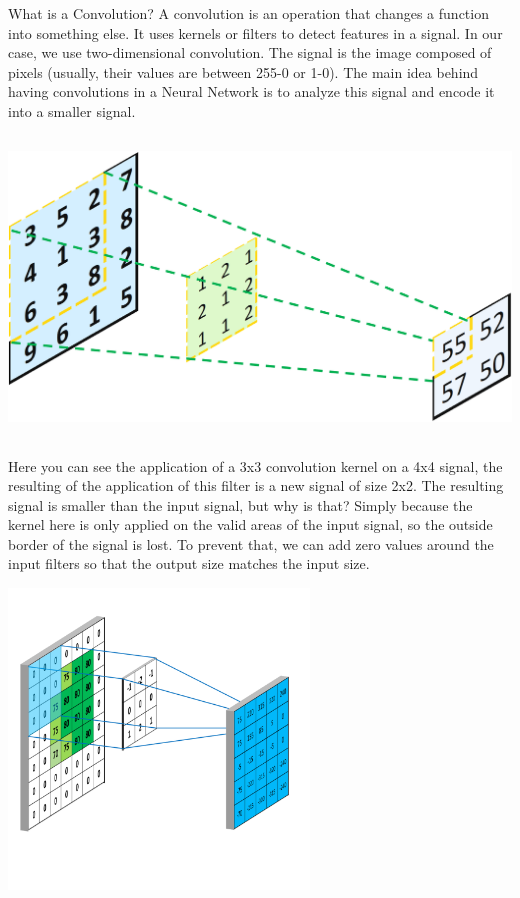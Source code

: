 \documentclass[12pt]{article}
\begin{document}
What is a Convolution? 
A convolution is an operation that changes a function into something else. It uses kernels or filters to detect features in a signal. In our case, we use two-dimensional convolution. The signal is the image composed of pixels (usually, their values are between 255-0 or 1-0). The main idea behind having convolutions in a Neural Network is to analyze this signal and encode it into a smaller signal. \\
\centerline{\includegraphics[height=8cm]{../../docs/convolution.png}}

Here you can see the application of a 3x3 convolution kernel on a 4x4 signal, the resulting of the application of this filter is a new signal of size 2x2. The resulting signal is smaller than the input signal, but why is that? Simply because the kernel here is only applied on the valid areas of the input signal, so the outside border of the signal is lost. To prevent that, we can add zero values around the input filters so that the output size matches the input size. \\
\centerline{\includegraphics[height=8cm]{../../docs/padding.png}}
\end{document}
